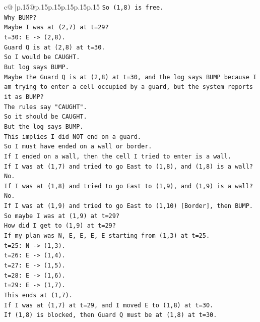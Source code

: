 \documentclass{article}
\begin{document}
{\begin{supertabular}{c@{$\;$}|p{.15\linewidth}@{}p{.15\linewidth}p{.15\linewidth}p{.15\linewidth}p{.15\linewidth}p{.15\linewidth}}
{{{\texttt{So (1,8) is free.} \\
\texttt{Why BUMP?} \\
\texttt{Maybe I was at (2,7) at t=29?} \\
\texttt{t=30: E {-}> (2,8).} \\
\texttt{Guard Q is at (2,8) at t=30.} \\
\texttt{So I would be CAUGHT.} \\
\texttt{But log says BUMP.} \\
\texttt{Maybe the Guard Q is at (2,8) at t=30, and the log says BUMP because I am trying to enter a cell occupied by a guard, but the system reports it as BUMP?} \\
\texttt{The rules say "CAUGHT".} \\
\texttt{So it should be CAUGHT.} \\
\texttt{But the log says BUMP.} \\
\texttt{This implies I did NOT end on a guard.} \\
\texttt{So I must have ended on a wall or border.} \\
\texttt{If I ended on a wall, then the cell I tried to enter is a wall.} \\
\texttt{If I was at (1,7) and tried to go East to (1,8), and (1,8) is a wall?} \\
\texttt{No.} \\
\texttt{If I was at (1,8) and tried to go East to (1,9), and (1,9) is a wall?} \\
\texttt{No.} \\
\texttt{If I was at (1,9) and tried to go East to (1,10) {[}Border{]}, then BUMP.} \\
\texttt{So maybe I was at (1,9) at t=29?} \\
\texttt{How did I get to (1,9) at t=29?} \\
\texttt{If my plan was N, E, E, E, E starting from (1,3) at t=25.} \\
\texttt{t=25: N {-}> (1,3).} \\
\texttt{t=26: E {-}> (1,4).} \\
\texttt{t=27: E {-}> (1,5).} \\
\texttt{t=28: E {-}> (1,6).} \\
\texttt{t=29: E {-}> (1,7).} \\
\texttt{This ends at (1,7).} \\
\texttt{If I was at (1,7) at t=29, and I moved E to (1,8) at t=30.} \\
\texttt{If (1,8) is blocked, then Guard Q must be at (1,8) at t=30.} \\
}}}
\end{supertabular}}
\end{document}

